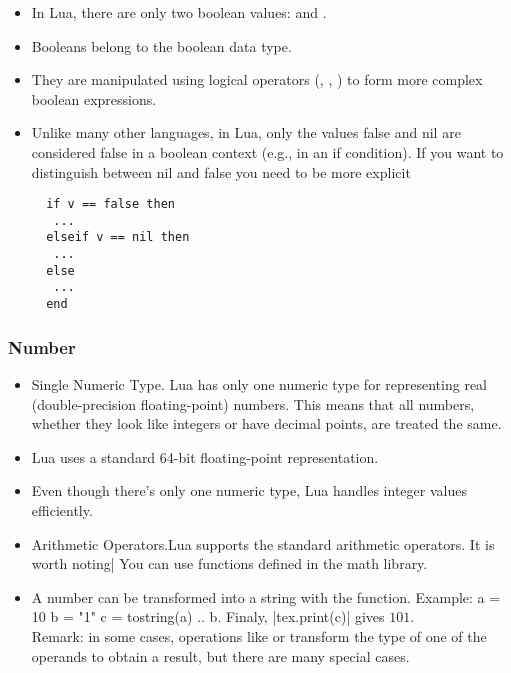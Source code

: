 \begin{itemize}
  \item In Lua, there are only two boolean values:  and .
  \item Booleans belong to the boolean data type.
  \item They are manipulated using logical operators (, , ) to form more complex boolean expressions.
  \item Unlike many other languages, in Lua, only the values false and nil are considered false in a boolean context (e.g., in an if condition).
  If you want to distinguish between nil and false you need to be more explicit
\begin{mybox}
\begin{verbatim}
  if v == false then
   ...
  elseif v == nil then
   ...
  else
   ...
  end
\end{verbatim}
\end{mybox}


\end{itemize}

\subsubsection{Number} %
\label{ssub:number}

\begin{itemize}
  \item Single Numeric Type.  Lua has only one numeric type for representing real (double-precision floating-point) numbers. This means that all numbers, whether they look like integers or have decimal points, are treated the same.

\item Lua uses a standard 64-bit floating-point representation.
\item Even though there's only one numeric type, Lua handles integer values efficiently.

\item  Arithmetic Operators.Lua supports the standard arithmetic operators. It is worth noting|%
You can use functions defined in the math library.

\item A number can be transformed into a string with the  function. Example: a = 10 b = "1" c = tostring(a) .. b. Finaly, |tex.print(c)| gives $101$.\\
Remark: in some cases, operations like  or  transform the type of one of the operands to obtain a result, but there are many special cases.

\end{itemize}

